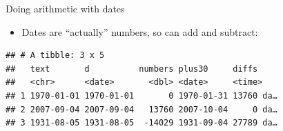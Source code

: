 \documentclass[ignorenonframetext,]{beamer}
\newenvironment{Shaded}{\begin{snugshade}}{\end{snugshade}}
\newcommand{\DataTypeTok}[1]{\textcolor[rgb]{0.13,0.29,0.53}{#1}}
\newcommand{\DecValTok}[1]{\textcolor[rgb]{0.00,0.00,0.81}{#1}}
\newcommand{\KeywordTok}[1]{\textcolor[rgb]{0.13,0.29,0.53}{\textbf{#1}}}
\newcommand{\NormalTok}[1]{#1}
\newcommand{\OperatorTok}[1]{\textcolor[rgb]{0.81,0.36,0.00}{\textbf{#1}}}
\newcommand{\StringTok}[1]{\textcolor[rgb]{0.31,0.60,0.02}{#1}}
\providecommand{\tightlist}{%
  \setlength{\itemsep}{0pt}\setlength{\parskip}{0pt}}
\begin{document}
\begin{frame}[fragile]{Doing arithmetic with dates}
\protect\hypertarget{doing-arithmetic-with-dates}{}

\begin{itemize}
\tightlist
\item
  Dates are ``actually'' numbers, so can add and subtract:
\end{itemize}

\begin{Shaded}
\end{Shaded}

\begin{verbatim}
## # A tibble: 3 x 5
##   text       d          numbers plus30     diffs    
##   <chr>      <date>       <dbl> <date>     <time>   
## 1 1970-01-01 1970-01-01       0 1970-01-31 13760 da…
## 2 2007-09-04 2007-09-04   13760 2007-10-04     0 da…
## 3 1931-08-05 1931-08-05  -14029 1931-09-04 27789 da…
\end{verbatim}

\end{frame}
\end{document}

